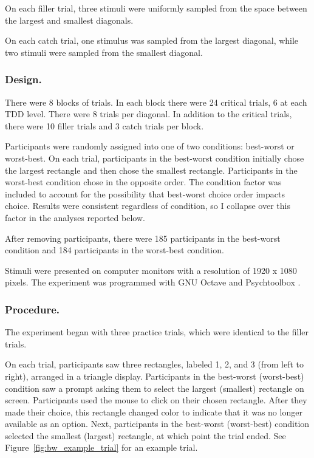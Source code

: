 On each filler trial, three stimuli were uniformly sampled from the space between the largest and smallest diagonals.

On each catch trial, one stimulus was sampled from the largest diagonal, while two stimuli were sampled from the smallest diagonal.

\subsubsection{Design.}
There were 8 blocks of trials. In each block there were 24 critical trials, 6 at each TDD level. There were 8 trials per diagonal. In addition to the critical trials, there were 10 filler trials and 3 catch trials per block.

Participants were randomly assigned into one of two conditions: best-worst or worst-best. On each trial, participants in the best-worst condition initially chose the largest rectangle and then chose the smallest rectangle. Participants in the worst-best condition chose in the opposite order. The condition factor was included to account for the possibility that best-worst choice order impacts choice. Results were consistent regardless of condition, so I collapse over this factor in the analyses reported below.

After removing participants, there were 185 participants in the best-worst condition and 184 participants in the worst-best condition.

Stimuli were presented on computer monitors with a resolution of 1920 x 1080 pixels. The experiment was programmed with GNU Octave and Psychtoolbox \parencite{octave,brainardPsychophysicsToolbox1997}. 

\subsubsection{Procedure.}

The experiment began with three practice trials, which were identical to the filler trials. 

On each trial, participants saw three rectangles, labeled 1, 2, and 3 (from left to right), arranged in a triangle display. Participants in the best-worst (worst-best) condition saw a prompt asking them to select the largest (smallest) rectangle on screen. Participants used the mouse to click on their chosen rectangle. After they made their choice, this rectangle changed color to indicate that it was no longer available as an option. Next, participants in the best-worst (worst-best) condition selected the smallest (largest) rectangle, at which point the trial ended. See Figure~\ref{fig:bw_example_trial} for an example trial.


